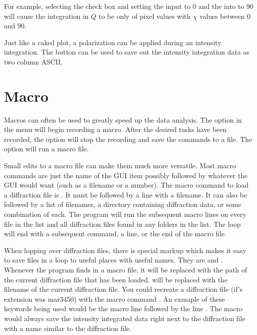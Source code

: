 For example, selecting the 
check box and setting the  input to 0 and the
 into to 90 will cause the integration in $Q$
to be only of pixel values with $\chi$ values between 0 and 90. 

Just like a caked plot, a polarization can be applied during
an intensity integration. The  button can be used
to save out the intensity integration data as two column ASCII. 

\section{Macro}

Macros can often be used to greatly speed up the data analysis. 
The  option in the  menu
will begin recording a macro. After the desired
tasks have been recorded, the  option will
stop the recording and save the commands to a file. The
 option will run a macro file.

Small edits to a macro file can make them much more versatile. 
Most macro commands are just the name of the GUI item
possibly followed by whatever the GUI would want (such as a 
filename or a number). The macro command to load a diffraction 
file is . It must be followed by a line with 
a filename. It can also be followed by a list of filenames,
a directory containing diffraction data, or some combination
of each. The program will run the subsequent macro lines on
every file in the list and all diffraction files found 
in any folders in the list. The loop will end with a subsequent 
 command, a  line, or 
the end of the macro file.

When lopping over diffraction files, there is special 
markup which makes it easy to save files in a loop to useful
places with useful names. They are 
 and . Whenever the
program finds  in a macro file,
it will be replaced with the path of the current
diffraction file that has been loaded. 
 will be replaced with the filename of
the current diffraction file. You could recreate a
diffraction file (if's extension was mar3450) with the macro 
command .
An exmaple of these keywords being used would be the macro line 
 followed by the line
. The macro would always
save the intensity integrated data right next to the diffraction 
file with a name similar to the diffraction file.
